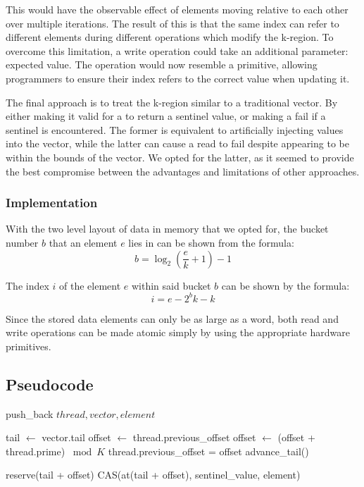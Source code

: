 \documentclass{sigplanconf}
\begin{document}
This would have the observable effect of elements moving relative to each other over multiple iterations. The result of this is that the same index can refer to different elements during different operations which modify the k-region. To overcome this limitation, a write operation could take an additional parameter: expected value. The operation would now resemble a  primitive, allowing programmers to ensure their index refers to the correct value when updating it.

The final approach is to treat the k-region similar to a traditional vector. By either making it valid for a  to return a sentinel value, or making a  fail if a sentinel is encountered. The former is equivalent to artificially injecting values into the vector, while the latter can cause a read to fail despite appearing to be within the bounds of the vector. We opted for the latter, as it seemed to provide the best compromise between the advantages and limitations of other approaches.

\subsubsection{Implementation}

With the two level layout of data in memory that we opted for, the bucket number $b$ that an element $e$ lies in can be shown from the formula:
  $$ b = \log_2\left(\frac{e}{k}+1\right)-1 $$

The index $i$ of the element $e$ within said bucket $b$ can be shown by the formula:
  $$ i = e - 2^{b}k - k $$

Since the stored data elements can only be as large as a word, both read and write operations can be made atomic simply by using the appropriate hardware primitives.

\subsection{Pseudocode}

\newcommand{\as}{$\leftarrow$ }
\newcommand{\eq}{$=$ }

\begin{algorithm}
\caption{push\_back $thread, vector, element$}
\begin{algorithmic}
\STATE tail \as vector.tail
\REPEAT
  \STATE offset \as thread.previous\_offset
  \WHILE{at(tail + offset) \eq sentinel\_value}
    \STATE offset \as (offset + thread.prime) $\bmod{K}$
    \STATE thread.previous\_offset = offset
    \IF{offset \eq 0}
      \STATE advance\_tail()
    \ENDIF
  \ENDWHILE

  reserve(tail + offset)
\UNTIL CAS(at(tail + offset), sentinel\_value, element)
\end{algorithmic}
\label{alg:pushback}
\end{algorithm}
\end{document}
